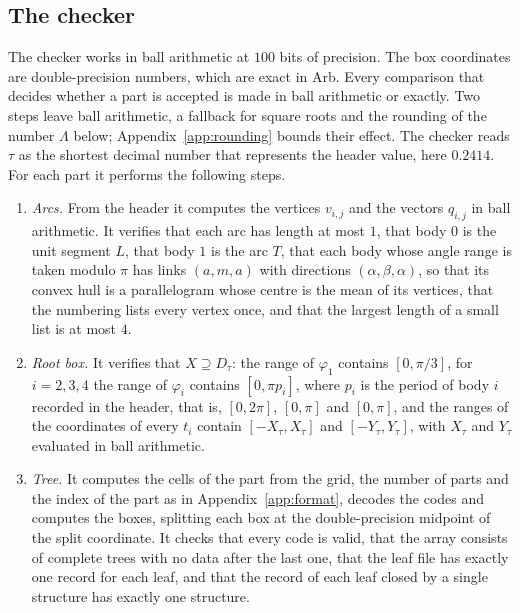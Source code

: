 \documentclass[11pt]{amsart}
\theoremstyle{definition}
\theoremstyle{remark}
\numberwithin{equation}{section}
\newcommand{\TAU}{0.2414}
\begin{document}
\subsection{The checker}\label{sec:checker} The checker works in ball arithmetic at $100$ bits of precision. The box coordinates are double-precision numbers, which are exact in Arb. Every comparison that decides whether a part is accepted is made in ball arithmetic or exactly. Two steps leave ball arithmetic, a fallback for square roots and the rounding of the number $\Lambda$ below; Appendix~\ref{app:rounding} bounds their effect. The checker reads $\tau$ as the shortest decimal number that represents the header value, here $\TAU$. For each part it performs the following steps.
\begin{enumerate}[label=(\arabic*),leftmargin=*]
\item\label{st:family} \emph{Arcs.} From the header it computes the vertices $v_{i,j}$ and the vectors $q_{i,j}$ in ball arithmetic. It verifies that each arc has length at most $1$, that body $0$ is the unit segment $L$, that body $1$ is the arc $T$, that each body whose angle range is taken modulo $\pi$ has links $(a,m,a)$ with directions $(\alpha,\beta,\alpha)$, so that its convex hull is a parallelogram whose centre is the mean of its vertices, that the numbering lists every vertex once, and that the largest length of a small list is at most $4$.
\item\label{st:root} \emph{Root box.} It verifies that $X\supseteq D_\tau$: the range of $\varphi_1$ contains $[0,\pi/3]$, for $i=2,3,4$ the range of $\varphi_i$ contains $[0,\pi p_i]$, where $p_i$ is the period of body $i$ recorded in the header, that is, $[0,2\pi]$, $[0,\pi]$ and $[0,\pi]$, and the ranges of the coordinates of every $t_i$ contain $[-X_\tau,X_\tau]$ and $[-Y_\tau,Y_\tau]$, with $X_\tau$ and $Y_\tau$ evaluated in ball arithmetic.
\item\label{st:tree} \emph{Tree.} It computes the cells of the part from the grid, the number of parts and the index of the part as in Appendix~\ref{app:format}, decodes the codes and computes the boxes, splitting each box at the double-precision midpoint of the split coordinate. It checks that every code is valid, that the array consists of complete trees with no data after the last one, that the leaf file has exactly one record for each leaf, and that the record of each leaf closed by a single structure has exactly one structure.

\end{enumerate}
\end{document}
